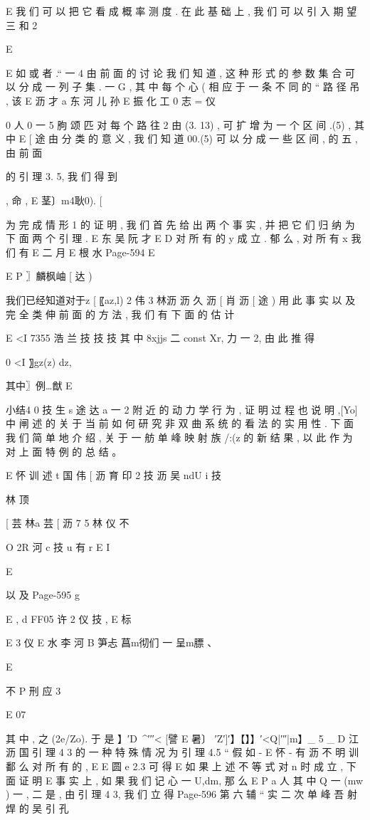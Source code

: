 {{E
我 们 可 以 把 它 看 成 概 率 测 度 . 在 此 基 础 上 , 我 们 可 以 引 入 期 望 三 和
2

E

E 如
或 者 .“ 一 4 由 前 面 的 讨 论 我 们 知 道 , 这 种 形 式 的 参 数 集 合 可 以 分
成 一 列 子 集 . 一 G , 其 中 每 个 心 ( 相 应 于 一 条 不 同 的 “ 路 径 吊 , 该
E 沥 才 a 东 河 儿 孙
E 振 化 工 0 志 = 仪

0 人 0 一 5 朐
颂 匹
对 每 个 路 往 2 由 (3. 13) , 可 扩 增 为 一 个 区 间 .(5) , 其 中
E [ 途
由 分 类 的 意 义 , 我 们 知 道 00.(5) 可 以 分 成 一 些 区 间 , 的 五 , 由 前 面

的 引 理 3. 5, 我 们 得 到

, 命 ,
E 茎〕m4耿0). [

为 完 成 情 形 1 的 证 明 , 我 们 首 先 给 出 两 个 事 实 , 并 把 它 们 归 纳
为 下 面 两 个 引 理 .
E 东 吴 阮 才
E
D
对 所 有 的 y 成 立 . 郁 么 , 对 所 有 x 我 们 有
E 二 月
E 根 水
Page-594
E

E
P 〗麟枫岫 [ 达 )

我们已经知道对于z [ 〖az,l) 2 伟 3 林沥 沥 久
沥
[ 肖 沥 [ 途 )
用 此 事 实 以 及 完 全 类 伸 前 面 的 方 法 , 我 们 有 下 面 的 估 计

E <I 7355 浩 兰 技 技 技
其 中 8xjjs 二 const Xr, 力 一 2, 由 此 推 得

0 <I 〗gz(z) dz,

其中〗例…猷 E

小结4 0 技 生 s 途 达
a 一 2 附 近 的 动 力 学 行 为 , 证 明 过 程 也 说 明 ,[Yo] 中 闸 述 的 关 于 当
前 如 何 研 究 非 双 曲 系 统 的 看 法 的 实 用 性 . 下 面 我 们 简 单 地 介 绍 , 关
于 一 舫 单 峰 映 射 族 /:(z 的 新 结 果 , 以 此 作 为 对 上 面 特 例 的 总 结 。

E 怀 训 述 t 国 伟
[ 沥 育 印 2 技 沥 吴 ndU i 技

林 顶

[ 芸 林a 芸
[ 沥 7 5
林 仪 不

O 2R 河 c 技 u
有 r E I

E

以 及
Page-595
g

E , d
FF05 许 2 仪 技 ,
E 标

E 3 仪 E 水 李 河
B 笋忐 菖m彻们 一 呈m膘 、

E

不
P 刑 应 3

E 07

其 中 , 之 (2e/Zo). 于 是
】′D~^′′′< [譬 E 暑〕 ′Z′]′】【】】′<Q|′″|m】_ 5 _
D 江 沥 国
引 理 4 3 的 一 种 特 殊 情 况 为
引 理 4.5 “ 假 如 -
E 怀 - 有 沥 不 明 训
鄱 么 对 所 有 的 ,
E
E 圆 e
2.3 可 得
E
如 果 上 述 不 等 式 对 n 时 成 立 , 下 面 证 明
E
事 实 上 , 如 果 我 们 记 心 一 U,dm, 那 么
E P
a
人
其 中 Q 一 (mw ) 一 , 二 是 , 由 引 理 4 3, 我 们 立 得
Page-596
第 六 辅 “ 实 二 次 单 峰 吾 射 焊 的 吴 引 孔

}}

